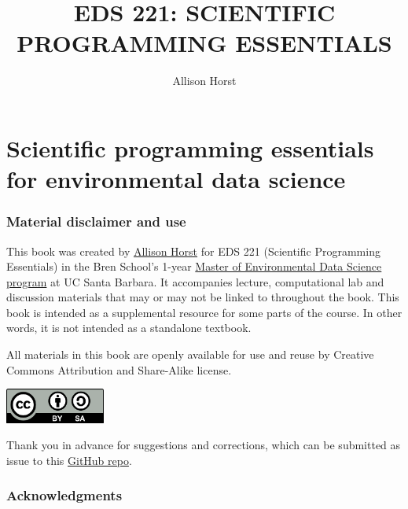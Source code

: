 \documentclass[
]{book}
\title{EDS 221: SCIENTIFIC PROGRAMMING ESSENTIALS}
\author{Allison Horst}
\date{}
\begin{document}
\maketitle

{
\setcounter{tocdepth}{1}
\tableofcontents
}
\hypertarget{scientific-programming-essentials-for-environmental-data-science}{%
\chapter{Scientific programming essentials for environmental data science}\label{scientific-programming-essentials-for-environmental-data-science}}

\hypertarget{material-disclaimer-and-use}{%
\subsection*{Material disclaimer and use}\label{material-disclaimer-and-use}}

This book was created by \href{www.allisonhorst.com}{Allison Horst} for EDS 221 (Scientific Programming Essentials) in the Bren School's 1-year \href{https://bren.ucsb.edu/masters-programs/master-environmental-data-science}{Master of Environmental Data Science program} at UC Santa Barbara. It accompanies lecture, computational lab and discussion materials that may or may not be linked to throughout the book. This book is intended as a supplemental resource for some parts of the course. In other words, it is not intended as a standalone textbook.

All materials in this book are openly available for use and reuse by Creative Commons Attribution and Share-Alike license.

\href{https://creativecommons.org/licenses/}{\includegraphics[width=1.29167in,height=\textheight]{images/cc_by_sa.png}}

Thank you in advance for suggestions and corrections, which can be submitted as issue to this \href{https://github.com/allisonhorst/eds-221}{GitHub repo}.

\hypertarget{acknowledgments}{%
\subsection*{Acknowledgments}\label{acknowledgments}}
\end{document}

